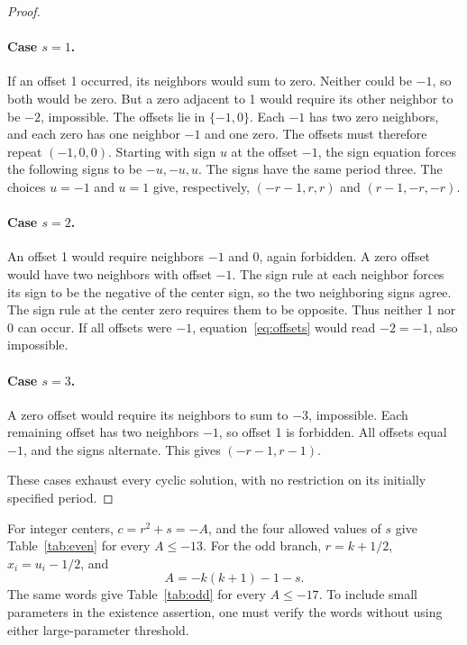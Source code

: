 \begin{proof}
\paragraph{Case \(s=1\).}
If an offset 1 occurred, its neighbors would sum to zero. Neither
could be \(-1\), so both would be zero. But a zero adjacent to 1 would
require its other neighbor to be \(-2\), impossible. The offsets lie
in \(\{-1,0\}\). Each \(-1\) has two zero neighbors, and each zero
has one neighbor \(-1\) and one zero. The offsets must therefore repeat
\((-1,0,0)\). Starting with sign \(u\) at the offset \(-1\), the sign
equation forces the following signs to be \(-u,-u,u\). The signs have
the same period three. The choices \(u=-1\) and \(u=1\) give,
respectively, \((-r-1,r,r)\) and \((r-1,-r,-r)\).

\paragraph{Case \(s=2\).}
An offset 1 would require neighbors \(-1\) and 0, again forbidden.
A zero offset would have two neighbors with offset \(-1\). The sign
rule at each neighbor forces its sign to be the negative of the center
sign, so the two neighboring signs agree. The sign rule at the center
zero requires them to be opposite. Thus neither 1 nor 0 can occur.
If all offsets were \(-1\), equation~\eqref{eq:offsets} would read
\(-2=-1\), also impossible.

\paragraph{Case \(s=3\).}
A zero offset would require its neighbors to sum to \(-3\), impossible.
Each remaining offset has two neighbors \(-1\), so offset 1 is
forbidden. All offsets equal \(-1\), and the signs alternate. This
gives \((-r-1,r-1)\).

These cases exhaust every cyclic solution, with no restriction on its
initially specified period.
\end{proof}

For integer centers, \(c=r^2+s=-A\), and the four allowed values of
\(s\) give Table~\ref{tab:even} for every \(A\le-13\). For the odd
branch, \(r=k+1/2\), \(x_i=u_i-1/2\), and
\begin{equation}
 A=-k(k+1)-1-s.
 \label{eq:odd_table_parameter}
\end{equation}
The same words give Table~\ref{tab:odd} for every \(A\le-17\).
To include small parameters in the existence assertion, one must verify
the words without using either large-parameter threshold.

